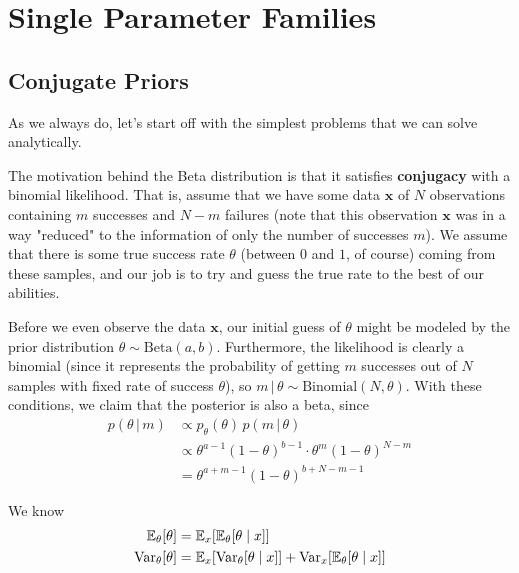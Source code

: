\section{Single Parameter Families} 

\subsection{Conjugate Priors}

  As we always do, let's start off with the simplest problems that we can solve analytically. 

  \begin{example}
    The motivation behind the Beta distribution is that it satisfies \textbf{conjugacy} with a binomial likelihood. That is, assume that we have some data $\mathbf{x}$ of $N$ observations containing $m$ successes and $N-m$ failures (note that this observation $\mathbf{x}$ was in a way "reduced" to the information of only the number of successes $m$). We assume that there is some true success rate $\theta$ (between $0$ and $1$, of course) coming from these samples, and our job is to try and guess the true rate to the best of our abilities.

    Before we even observe the data $\mathbf{x}$, our initial guess of $\theta$ might be modeled by the prior distribution $\theta \sim \text{Beta}(a, b)$. Furthermore, the likelihood is clearly a binomial (since it represents the probability of getting $m$ successes out of $N$ samples with fixed rate of success $\theta$), so $m\,|\,\theta \sim \text{Binomial}(N, \theta)$. With these conditions, we claim that the posterior is also a beta, since
    \begin{align*}
      p(\theta\,|\, m) & \propto p_\theta (\theta) \, p(m\,|\,\theta) \\
      & \propto \theta^{a - 1} (1 - \theta)^{b - 1} \cdot \theta^m (1 - \theta)^{N - m} \\
      & = \theta^{a + m - 1} (1 - \theta)^{b + N - m - 1}
    \end{align*}
  \end{example}

  \begin{theorem}
    We know 
    \begin{align}
      \mathbb{E}_\theta [\theta] & = \mathbb{E}_x [ \mathbb{E}_{\theta} [\theta \mid x]] \\  
      \operatorname{Var}_\theta [\theta] & = \mathbb{E}_x [ \operatorname{Var}_\theta [\theta \mid x]] + \operatorname{Var}_x [ \mathbb{E}_\theta [\theta \mid x]]
    \end{align}
  \end{theorem}

